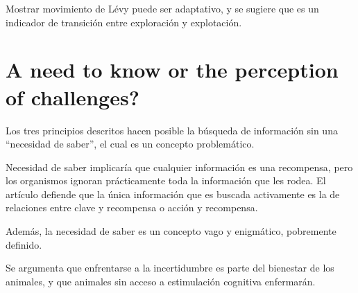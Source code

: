 \documentclass[a4paper,12pt]{article}
\begin{document}
Mostrar movimiento de Lévy puede ser adaptativo, y se sugiere que es un indicador de transición entre exploración y explotación.

\section{A need to know or the perception of challenges?}

Los tres principios descritos hacen posible la búsqueda de información sin una ``necesidad de saber'', el cual es un concepto problemático.

Necesidad de saber implicaría que cualquier información es una recompensa, pero los organismos ignoran prácticamente toda la información que les rodea.
El artículo defiende que la única información que es buscada activamente es la de relaciones entre clave y recompensa o acción y recompensa.

Además, la necesidad de saber es un concepto vago y enigmático, pobremente definido.

Se argumenta que enfrentarse a la incertidumbre es parte del bienestar de los animales, y que animales sin acceso a estimulación cognitiva enfermarán.
\end{document}
